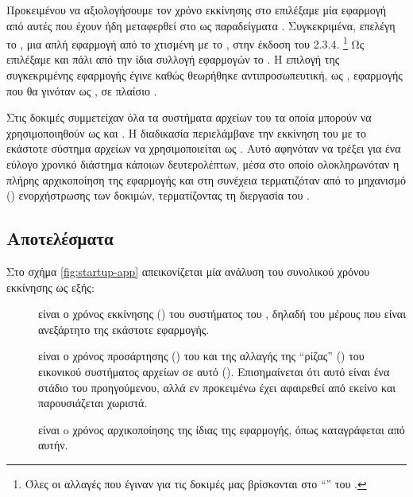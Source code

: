 Προκειμένου να αξιολογήσουμε τον χρόνο εκκίνησης στο \viofs{} επιλέξαμε μία
εφαρμογή από αυτές που έχουν ήδη μεταφερθεί στο \osv{} ως παραδείγματα
\cite{osv-apps}. Συγκεκριμένα, επελέγη το , μια απλή
 εφαρμογή από το \cite{spring-boot-examples}
χτισμένη με το , %
στην έκδοση του 2.3.4.%
\footnote{Όλες οι αλλαγές που έγιναν για τις δοκιμές μας βρίσκονται στο
``''  του .}
Ως  επιλέξαμε και πάλι από την ίδια
συλλογή εφαρμογών το . %
Η επιλογή της συγκεκριμένης εφαρμογής έγινε καθώς θεωρήθηκε αντιπροσωπευτική,
ως , εφαρμογής που θα γινόταν  ως
, σε πλαίσιο .

Στις δοκιμές συμμετείχαν όλα τα συστήματα αρχείων του \osv{} τα οποία μπορούν να
χρησιμοποιηθούν ως  και \viofs{}. Η
διαδικασία περιελάμβανε την εκκίνηση του \osv{} με το εκάστοτε σύστημα αρχείων
να χρησιμοποιείται ως . Αυτό αφηνόταν να τρέξει για ένα
εύλογο χρονικό διάστημα κάποιων δευτερολέπτων, μέσα στο οποίο ολοκληρωνόταν η
πλήρης αρχικοποίηση της εφαρμογής και στη συνέχεια τερματιζόταν από το μηχανισμό
() ενορχήστρωσης των δοκιμών, τερματίζοντας τη διεργασία του \qemu{}.

\subsection{Αποτελέσματα}

Στο σχήμα \ref{fig:startup-app} απεικονίζεται μία ανάλυση του συνολικού χρόνου
εκκίνησης ως εξής:
\begin{description}
    \item[] είναι ο χρόνος εκκίνησης () του συστήματος του
          \osv{}, δηλαδή του μέρους που είναι ανεξάρτητο της εκάστοτε εφαρμογής.
    \item[] είναι ο χρόνος προσάρτησης () του
           και της αλλαγής της ``ρίζας'' (\en{/}) του
          εικονικού συστήματος αρχείων σε αυτό (). Επισημαίνεται ότι
          αυτό είναι ένα στάδιο του προηγούμενου, αλλά εν προκειμένω έχει
          αφαιρεθεί από εκείνο και παρουσιάζεται χωριστά.
    \item[] είναι o χρόνος αρχικοποίησης της ίδιας της
          εφαρμογής, όπως καταγράφεται από αυτήν.
\end{description}

